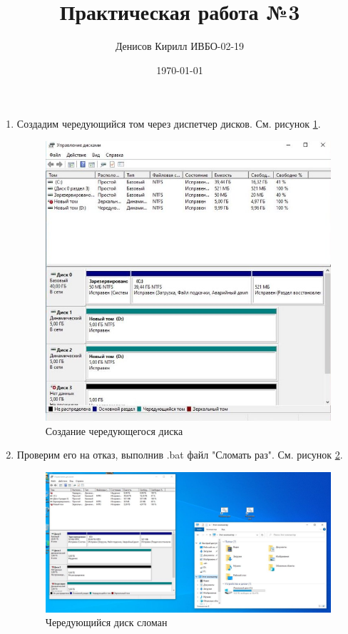 \documentclass[a4paper,14pt]{extarticle}
\author{Денисов Кирилл ИВБО-02-19}
\title{Практическая работа №3}
\date{\today}
\begin{document}
	\maketitle
	
	\begin{enumerate}
		\item Создадим чередующийся том через диспетчер дисков. См. рисунок \ref{fig:1}.
	
	\begin{figure}[h!]
		\centering
		\includegraphics[width=0.6\linewidth]{1}
		\caption{Создание чередующегося диска}
		\label{fig:1}
	\end{figure}
\newpage

 \item Проверим его на отказ, выполнив .bat файл "Сломать раз". См. рисунок \ref{fig:3}.
\begin{figure}[h!]
	\centering
	\includegraphics[width=0.7\linewidth]{3}
	\caption{Чередующийся диск сломан}
	\label{fig:3}
\end{figure}


\end{enumerate}
\end{document}

